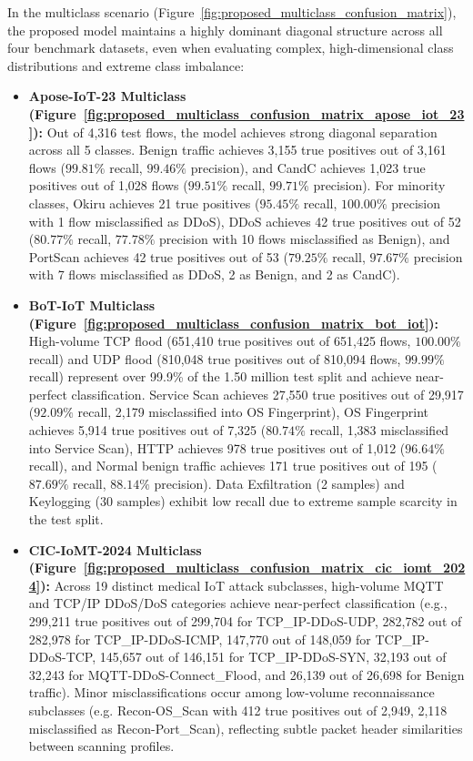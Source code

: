 \documentclass[a4paper,fleqn]{cas-sc}
\begin{document}
In the multiclass scenario (Figure~\ref{fig:proposed_multiclass_confusion_matrix}), the proposed model maintains a highly dominant diagonal structure across all four benchmark datasets, even when evaluating complex, high-dimensional class distributions and extreme class imbalance:
\begin{itemize}
    \item \textbf{Apose-IoT-23 Multiclass (Figure~\ref{fig:proposed_multiclass_confusion_matrix_apose_iot_23}):} Out of 4,316 test flows, the model achieves strong diagonal separation across all 5 classes. Benign traffic achieves 3,155 true positives out of 3,161 flows ($99.81\%$ recall, $99.46\%$ precision), and CandC achieves 1,023 true positives out of 1,028 flows ($99.51\%$ recall, $99.71\%$ precision). For minority classes, Okiru achieves 21 true positives ($95.45\%$ recall, $100.00\%$ precision with 1 flow misclassified as DDoS), DDoS achieves 42 true positives out of 52 ($80.77\%$ recall, $77.78\%$ precision with 10 flows misclassified as Benign), and PortScan achieves 42 true positives out of 53 ($79.25\%$ recall, $97.67\%$ precision with 7 flows misclassified as DDoS, 2 as Benign, and 2 as CandC).
    \item \textbf{BoT-IoT Multiclass (Figure~\ref{fig:proposed_multiclass_confusion_matrix_bot_iot}):} High-volume TCP flood (651,410 true positives out of 651,425 flows, $100.00\%$ recall) and UDP flood (810,048 true positives out of 810,094 flows, $99.99\%$ recall) represent over 99.9\% of the 1.50 million test split and achieve near-perfect classification. Service Scan achieves 27,550 true positives out of 29,917 ($92.09\%$ recall, 2,179 misclassified into OS Fingerprint), OS Fingerprint achieves 5,914 true positives out of 7,325 ($80.74\%$ recall, 1,383 misclassified into Service Scan), HTTP achieves 978 true positives out of 1,012 ($96.64\%$ recall), and Normal benign traffic achieves 171 true positives out of 195 ($87.69\%$ recall, $88.14\%$ precision). Data Exfiltration (2 samples) and Keylogging (30 samples) exhibit low recall due to extreme sample scarcity in the test split.
    \item \textbf{CIC-IoMT-2024 Multiclass (Figure~\ref{fig:proposed_multiclass_confusion_matrix_cic_iomt_2024}):} Across 19 distinct medical IoT attack subclasses, high-volume MQTT and TCP/IP DDoS/DoS categories achieve near-perfect classification (e.g., 299,211 true positives out of 299,704 for TCP\_IP-DDoS-UDP, 282,782 out of 282,978 for TCP\_IP-DDoS-ICMP, 147,770 out of 148,059 for TCP\_IP-DDoS-TCP, 145,657 out of 146,151 for TCP\_IP-DDoS-SYN, 32,193 out of 32,243 for MQTT-DDoS-Connect\_Flood, and 26,139 out of 26,698 for Benign traffic). Minor misclassifications occur among low-volume reconnaissance subclasses (e.g. Recon-OS\_Scan with 412 true positives out of 2,949, 2,118 misclassified as Recon-Port\_Scan), reflecting subtle packet header similarities between scanning profiles.

\end{itemize}
\end{document}
